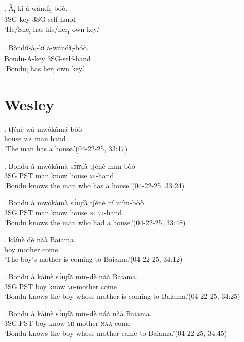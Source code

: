 \documentclass{assets/fieldnotes}
\begin{document}
\exg. \`{A}\textsubscript{i}-k\'{i} \`{a}-w\'{a}nd\`{i}\textsubscript{i}-b\'{o}\`{o}. \\
3SG-key 3SG-self-hand \\
`He/She\textsubscript{i} has his/her\textsubscript{i} own key.' 

\exg. B\`{o}nd\'{u}-\`{a}\textsubscript{i}-k\'{i} \`{a}-w\'{a}nd\`{i}\textsubscript{i}-b\'{o}\`{o}. \\
Bondu-A-key 3SG-self-hand \\
`Bondu\textsubscript{i} has her\textsubscript{i} own key.'

\section{Wesley}


\exg. tʃénè wá mwòkàmá bòò\\
house \textsc{wa} man hand\\
`The man has a house.’\hfill{(04-22-25, 33:17)}

\exg. Bondu à mwòkàmà sɔ́ɱfã̀ tʃénè mím-bòò\\
{} \textsc{3SG.PST} man know house \textsc{mi}-hand\\
`Bondu knows the man who has a house.’\hfill{(04-22-25, 33:24)}\\

\exg. Bondu à mwòkàmà sɔ́ɱfã̀ tʃénè ní mím-bòò\\
{} \textsc{3SG.PST} man know house \textsc{ni} \textsc{mi}-hand\\
`Bondu knows the man who had a house.’\hfill{(04-22-25, 33:48)}


\exg. káínè dè nàà Baiama.\\
boy mother come {}\\
`The boy’s mother is coming to Baiama.’\hfill{(04-22-25, 34:12)}

\exg. Bondu à kàìnè sɔ́ɱfã̀ mín-dè nàà Baiama.\\
{} \textsc{3SG.PST} boy know \textsc{mi}-mother come {}\\
`Bondu knows the boy whose mother is coming to Baiama.’\hfill{(04-22-25, 34:25)}

\exg. Bondu à kàìnè sɔ́ɱfã̀ mín-dè náà nàà Baiama.\\
{} \textsc{3SG.PST} boy know \textsc{mi}-mother \textsc{naa} come {}\\
`Bondu knows the boy whose mother came to Baiama.’\hfill{(04-22-25, 34:45)}
\end{document}
